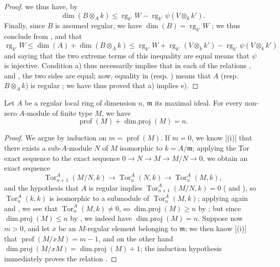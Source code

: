 \begin{proof}
we thus have, by 
\[
\label{0.17.3.3.5}
  \dim(B\otimes_A k)\leq\operatorname{rg}_{k'}W-\operatorname{rg}_{k'}\psi(V\otimes_k k').
  \tag{17.3.3.5}
\]
Finally, since $B$ is assumed regular, we have $\dim(B)=\operatorname{rg}_{k'}W$ ;
we thus conclude from ,  and  that
\[
  \operatorname{rg}_{k'}W\leq\dim(A)+\dim(B\otimes_A k)\leq\operatorname{rg}_{k'}W+\operatorname{rg}_{k'}(V\otimes_k k')-\operatorname{rg}_{k'}\psi(V\otimes_k k')
\]
and saying that the two extreme terms of this inequality are equal means that $\psi$ is injective.
Condition a) thus necessarily implies that in each of the relations ,  and , the two sides are equal;
now, equality in  (resp. ) means that $A$ (resp. $B\otimes_A k$) is regular ;
we have thus proved that a) implies e).
\end{proof}

\begin{proposition}[17.3.4]
\label{0.17.3.4}
Let $A$ be a regular local ring of dimension $n$, $\mathfrak{m}$ its maximal ideal.
For every non-zero $A$-module of finite type $M$, we have
\[
\label{0.17.3.4.1}
  \operatorname{prof}(M)+\operatorname{dim.proj}(M)=n.
  \tag{17.3.4.1}
\]
\end{proposition}

\begin{proof}
We argue by induction on $m=\operatorname{prof}(M)$.
If $m=0$, we know [(i)] that there exists a sub-$A$-module $N$ of $M$ isomorphic to $k=A/\mathfrak{m}$;
applying the Tor exact sequence to the exact sequence $0\to N\to M\to M/N\to 0$, we obtain an exact sequence
\[
  \operatorname{Tor}^A_{n+1}(M/N,k)\to\operatorname{Tor}^A_n(N,k)\to\operatorname{Tor}^A_n(M,k),
\]
and the hypothesis that $A$ is regular implies $\operatorname{Tor}^A_{n+1}(M/N,k)=0$ ( and ), so $\operatorname{Tor}^A_n(k,k)$ is isomorphic to a submodule of $\operatorname{Tor}^A_n(M,k)$;
applying again  and , we see that $\operatorname{Tor}^A_n(M,k)\neq 0$, so $\operatorname{dim.proj}(M)\geq n$ by ;
but since $\operatorname{dim.proj}(M)\leq n$ by , we indeed have $\operatorname{dim.proj}(M)=n$.
Suppose now $m>0$, and let $x$ be an $M$-regular element belonging to $\mathfrak{m}$;
we then know [(i)] that $\operatorname{prof}(M/xM)=m-1$, and on the other hand  $\operatorname{dim.proj}(M/xM)=\operatorname{dim.proj}(M)+1$;
the induction hypothesis immediately proves the relation .
\end{proof}

